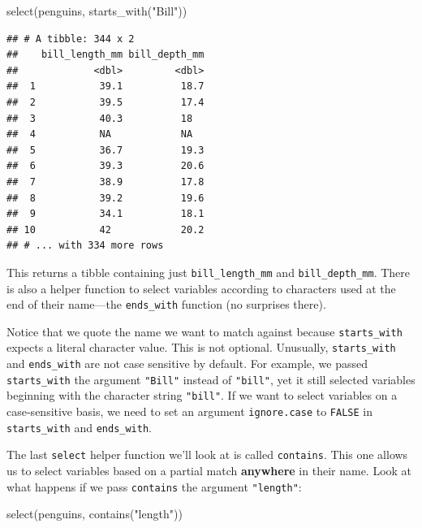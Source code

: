 \documentclass[
]{book}
\newenvironment{Shaded}{\begin{snugshade}}{\end{snugshade}}
\newcommand{\FunctionTok}[1]{\textcolor[rgb]{0.00,0.00,0.00}{#1}}
\newcommand{\NormalTok}[1]{#1}
\newcommand{\StringTok}[1]{\textcolor[rgb]{0.31,0.60,0.02}{#1}}
\begin{document}
\begin{Shaded}
\begin{Highlighting}[]
\FunctionTok{select}\NormalTok{(penguins, }\FunctionTok{starts\_with}\NormalTok{(}\StringTok{"Bill"}\NormalTok{))}
\end{Highlighting}
\end{Shaded}

\begin{verbatim}
## # A tibble: 344 x 2
##    bill_length_mm bill_depth_mm
##             <dbl>         <dbl>
##  1           39.1          18.7
##  2           39.5          17.4
##  3           40.3          18  
##  4           NA            NA  
##  5           36.7          19.3
##  6           39.3          20.6
##  7           38.9          17.8
##  8           39.2          19.6
##  9           34.1          18.1
## 10           42            20.2
## # ... with 334 more rows
\end{verbatim}

This returns a tibble containing just \texttt{bill\_length\_mm} and \texttt{bill\_depth\_mm}. There is also a helper function to select variables according to characters used at the end of their name---the \texttt{ends\_with} function (no surprises there).

Notice that we quote the name we want to match against because \texttt{starts\_with} expects a literal character value. This is not optional. Unusually, \texttt{starts\_with} and \texttt{ends\_with} are not case sensitive by default. For example, we passed \texttt{starts\_with} the argument \texttt{"Bill"} instead of \texttt{"bill"}, yet it still selected variables beginning with the character string \texttt{"bill"}. If we want to select variables on a case-sensitive basis, we need to set an argument \texttt{ignore.case} to \texttt{FALSE} in \texttt{starts\_with} and \texttt{ends\_with}.

The last \texttt{select} helper function we'll look at is called \texttt{contains}. This one allows us to select variables based on a partial match \textbf{anywhere} in their name. Look at what happens if we pass \texttt{contains} the argument \texttt{"length"}:

\begin{Shaded}
\begin{Highlighting}[]
\FunctionTok{select}\NormalTok{(penguins, }\FunctionTok{contains}\NormalTok{(}\StringTok{"length"}\NormalTok{))}
\end{Highlighting}
\end{Shaded}
\end{document}
